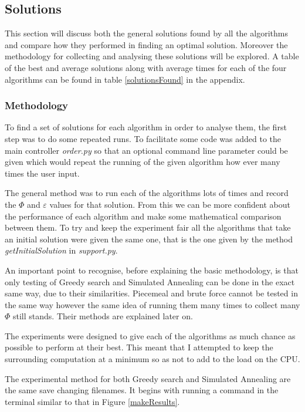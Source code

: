 \documentclass[12pt]{report}
\begin{document}
\subsection{Solutions}\label{solutions}
This section will discuss both the general solutions found by all the algorithms and compare how they performed in finding an optimal solution. Moreover the methodology for collecting and analysing these solutions will be explored. A table of the best and average solutions along with average times for each of the four algorithms can be found in table \ref{solutionsFound} in the appendix. 

\subsubsection{Methodology}
To find a set of solutions for each algorithm in order to analyse them, the first step was to do some repeated runs. To facilitate some code was added to the main controller \textit{order.py} so that an optional command line parameter could be given which would repeat the running of the given algorithm how ever many times the user input. 

The general method was to run each of the algorithms lots of times and record the $\Phi$ and $\varepsilon$ values for that solution. From this we can be more confident about the performance of each algorithm and make some mathematical comparison between them. To try and keep the experiment fair all the algorithms that take an initial solution were given the same one, that is the one given by the method \textit{getInitialSolution} in \textit{support.py}.

An important point to recognise, before explaining the basic methodology, is that only testing of Greedy search and Simulated Annealing can be done in the exact same way, due to their similarities. Piecemeal and brute force cannot be tested in the same way however the same idea of running them many times to collect many $\Phi$ still stands. Their methods are explained later on.

The experiments were designed to give each of the algorithms as much chance as possible to perform at their best. This meant that I attempted to keep the surrounding computation at a minimum so as not to add to the load on the CPU.

The experimental method for both Greedy search and Simulated Annealing are the same save changing filenames. It begins with running a command in the terminal similar to that in Figure \ref{makeResults}.
\end{document}
